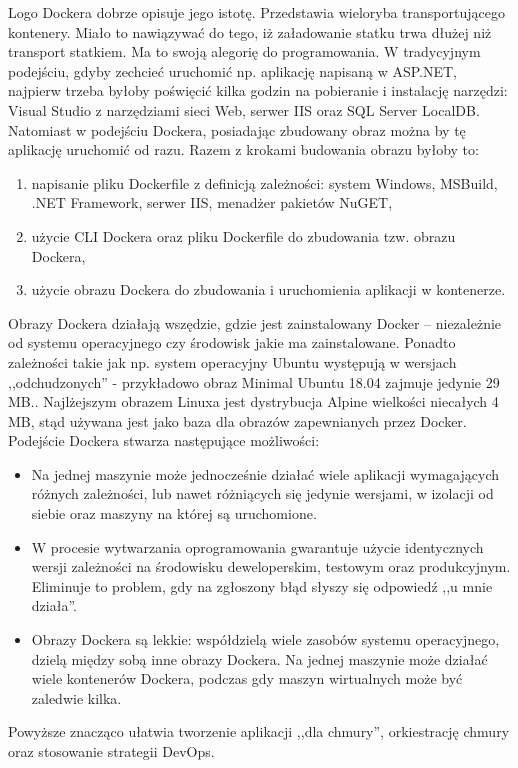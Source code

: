 \documentclass[12pt,a4paper,twoside,titlepage,openright]{book}
\begin{document}
Logo Dockera dobrze opisuje jego istotę. Przedstawia wieloryba transportującego kontenery. Miało to nawiązywać do tego, iż załadowanie statku trwa dłużej niż transport statkiem. Ma to swoją alegorię do programowania. W tradycyjnym podejściu, gdyby zechcieć uruchomić np. aplikację napisaną w ASP.NET, najpierw trzeba byłoby poświęcić kilka godzin na pobieranie i instalację narzędzi: Visual Studio z narzędziami sieci Web, serwer IIS oraz SQL Server LocalDB. Natomiast w podejściu Dockera, posiadając zbudowany obraz można by tę aplikację uruchomić od razu. Razem z krokami budowania obrazu byłoby to:
\begin{enumerate}
\item napisanie pliku Dockerfile z definicją zależności: system Windows, MSBuild, .NET Framework, serwer IIS, menadżer pakietów NuGET,
\item użycie CLI Dockera oraz pliku Dockerfile do zbudowania tzw. obrazu Dockera,
\item użycie obrazu Dockera do zbudowania i uruchomienia aplikacji w kontenerze.
\end{enumerate}
Obrazy Dockera działają wszędzie, gdzie jest zainstalowany Docker -- niezależnie od systemu operacyjnego czy środowisk jakie ma zainstalowane. Ponadto zależności takie jak np. system operacyjny Ubuntu występują w wersjach ,,odchudzonych'' - przykładowo obraz Minimal Ubuntu 18.04 zajmuje jedynie 29 MB.\cite{siteUbuntuBlog}. Najlżejszym obrazem Linuxa jest dystrybucja Alpine wielkości niecałych 4 MB, stąd używana jest jako baza dla obrazów zapewnianych przez Docker.\cite{dockerPacktMastering}
Podejście Dockera stwarza następujące możliwości:
\begin{itemize}
\item Na jednej maszynie może jednocześnie działać wiele aplikacji wymagających różnych zależności, lub nawet różniących się jedynie wersjami, w izolacji od siebie oraz maszyny na której są uruchomione.
\item W procesie wytwarzania oprogramowania gwarantuje użycie identycznych wersji zależności na środowisku deweloperskim, testowym oraz produkcyjnym. Eliminuje to problem, gdy na zgłoszony błąd słyszy się odpowiedź ,,u mnie działa''.
\item Obrazy Dockera są lekkie: współdzielą wiele zasobów systemu operacyjnego, dzielą między sobą inne obrazy Dockera.\cite{siteDockerStackOverflow} Na jednej maszynie może działać wiele kontenerów Dockera, podczas gdy maszyn wirtualnych może być zaledwie kilka.\cite{ccSpringer}
\end{itemize}
Powyższe znacząco ułatwia tworzenie aplikacji ,,dla chmury'', orkiestrację chmury oraz stosowanie strategii DevOps.
\end{document}
